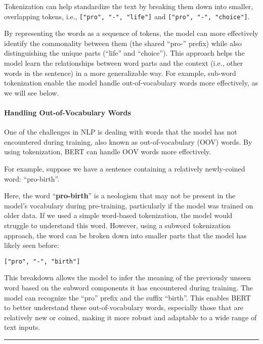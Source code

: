 \documentclass[11pt]{article}
\begin{document}
Tokenization can help standardize the text by breaking them down into
smaller, overlapping tokens, i.e., \texttt{{[}"pro",\ "-",\ "life"{]}}
and \texttt{{[}"pro",\ "-",\ "choice"{]}}.

By representing the words as a sequence of tokens, the model can more
effectively identify the commonality between them (the shared ``pro-''
prefix) while also distinguishing the unique parts (``life'' and
``choice''). This approach helps the model learn the relationships
between word parts and the context (i.e., other words in the sentence)
in a more generalizable way. For example, sub-word tokenization enable
the model handle out-of-vocabulary words more effectively, as we will
see below.

\hypertarget{handling-out-of-vocabulary-words}{%
\paragraph{\texorpdfstring{\textbf{Handling Out-of-Vocabulary
Words}}{Handling Out-of-Vocabulary Words}}\label{handling-out-of-vocabulary-words}}

One of the challenges in NLP is dealing with words that the model has
not encountered during training, also known as out-of-vocabulary (OOV)
words. By using tokenization, BERT can handle OOV words more
effectively.

For example, suppose we have a sentence containing a relatively
newly-coined word: ``pro-birth''.

Here, the word ``\textbf{pro-birth}'' is a neologism that may not be
present in the model's vocabulary during pre-training, particularly if
the model was trained on older data. If we used a simple word-based
tokenization, the model would struggle to understand this word. However,
using a subword tokenization approach, the word can be broken down into
smaller parts that the model has likely seen before:

\texttt{{[}"pro",\ "-",\ "birth"{]}}

This breakdown allows the model to infer the meaning of the previously
unseen word based on the subword components it has encountered during
training. The model can recognize the ``pro'' prefix and the suffix
``birth''. This enables BERT to better understand these
out-of-vocabulary words, especially those that are relatively new or
coined, making it more robust and adaptable to a wide range of text
inputs.

    \begin{center}\rule{0.5\linewidth}{0.5pt}\end{center}
\end{document}

